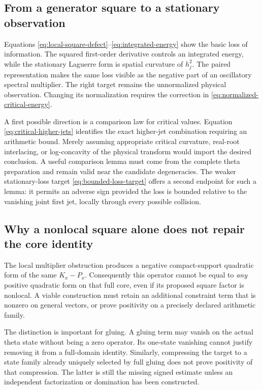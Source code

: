 \documentclass[11pt]{article}
\numberwithin{equation}{section}
\theoremstyle{definition}
\theoremstyle{remark}
\begin{document}
\subsection{From a generator square to a stationary observation}
Equations \eqref{eq:local-square-defect}--\eqref{eq:integrated-energy}
show the basic loss of information. The squared first-order derivative
controls an integrated energy, while the stationary Laguerre form is
spatial curvature of $h_j^2$. The paired representation makes the same
loss visible as the negative part of an oscillatory spectral multiplier.
The right target remains the unnormalized physical observation.
Changing its normalization requires the correction in
\eqref{eq:normalized-critical-energy}.

A first possible direction is a comparison law for critical values.
Equation \eqref{eq:critical-higher-jets} identifies the exact higher-jet
combination requiring an arithmetic bound. Merely assuming appropriate
critical curvature, real-root interlacing, or log-concavity of the physical
transform would import the desired conclusion. A useful comparison lemma
must come from the complete theta preparation and remain valid near the
candidate degeneracies. The weaker stationary-loss target
\eqref{eq:bounded-loss-target} offers a second endpoint for such a lemma:
it permits an adverse sign provided the loss is bounded relative to the
vanishing joint first jet, locally through every possible collision.

\subsection{Why a nonlocal square alone does not repair the core identity}
The local multiplier obstruction produces a negative compact-support
quadratic form of the same $K_x-P_x$. Consequently this operator cannot
be equal to \emph{any} positive quadratic form on that full core, even if
its proposed square factor is nonlocal. A viable construction must retain
an additional constraint term that is nonzero on general vectors, or
prove positivity on a precisely declared arithmetic family.

The distinction is important for gluing. A gluing term may vanish on the
actual theta state without being a zero operator. Its one-state vanishing
cannot justify removing it from a full-domain identity. Similarly,
compressing the target to a state family already uniquely selected by
full gluing does not prove positivity of that compression. The latter is
still the missing signed estimate unless an independent factorization or
domination has been constructed.
\end{document}
